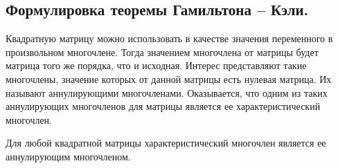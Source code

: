 \subsection{
    Формулировка теоремы Гамильтона – Кэли.
}

Квадратную матрицу можно использовать в качестве значения переменного в произвольном многочлене. Тогда значением многочлена от матрицы будет матрица того же порядка, что и исходная. Интерес представляют такие многочлены, значение которых от данной матрицы есть нулевая матрица. Их называют аннулирующими многочленами. Оказывается, что одним из таких аннулирующих многочленов для матрицы является ее характеристический многочлен.

\begin{theorem}
    Для любой квадратной матрицы характеристический многочлен является ее аннулирующим многочленом.
\end{theorem}
